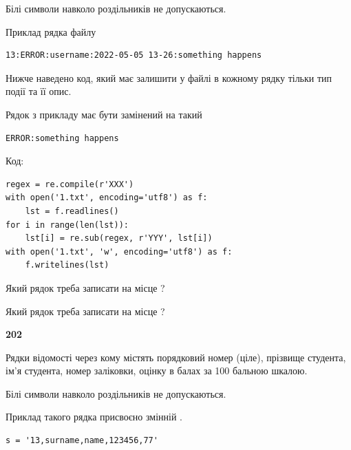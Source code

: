 Білі символи навколо роздільників не допускаються.

Приклад рядка файлу



\begin{verbatim}
13:ERROR:username:2022-05-05 13-26:something happens
\end{verbatim}


Нижче наведено код, який має залишити у файлі в кожному рядку тільки тип події та її опис.

Рядок з прикладу має бути замінений на такий



\begin{verbatim}
ERROR:something happens
\end{verbatim}




Код:



\begin{verbatim}
regex = re.compile(r'XXX')
with open('1.txt', encoding='utf8') as f:
    lst = f.readlines()
for i in range(len(lst)):
    lst[i] = re.sub(regex, r'YYY', lst[i])
with open('1.txt', 'w', encoding='utf8') as f:
    f.writelines(lst)
\end{verbatim}









Який рядок треба записати на місце  ?\par
\vspace{5mm}


Який рядок треба записати на місце  ?\par


\newpage

{\begin {center}\textbf{ 202}\end {center}}\par
Рядки відомості через кому містять порядковий номер (ціле), пріз\-ви\-ще студен\-та, ім'я студента, номер заліковки, оцінку в балах за 100 бальною шкалою.

Білі символи навколо роздільників не допускаються.

Приклад такого рядка присвоєно змінній .



\begin{verbatim}
s = '13,surname,name,123456,77'
\end{verbatim}



